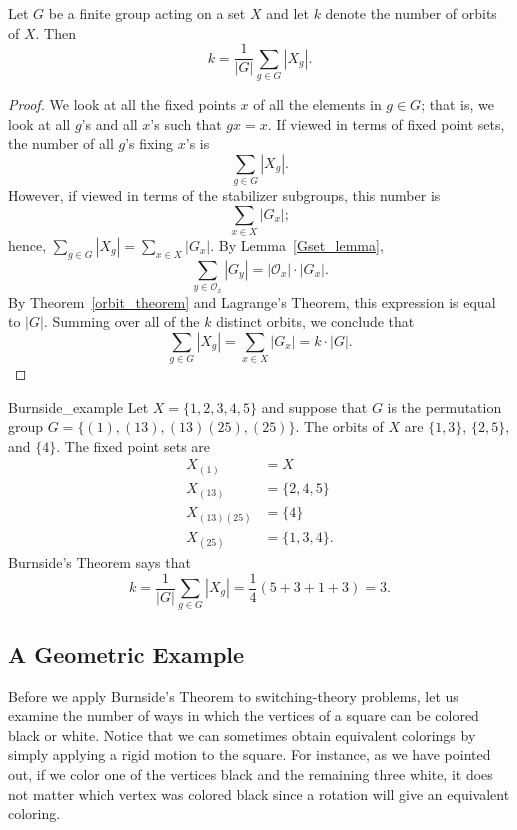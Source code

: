 
\begin{theorem}[Burnside]
Let $G$ be a  finite group acting on a set $X$ and let $k$ denote the
number of orbits of $X$. Then
\[
k = \frac{1}{|G|} \sum_{g \in G} |X_g|.
\]
\end{theorem}
 
 
\begin{proof}
We look at all the fixed points $x$ of all the elements in $g \in G$;
that is, we look at all $g$'s and all $x$'s such that $gx =x$.
If viewed in terms of fixed point sets, the number of all $g$'s fixing
$x$'s is 
\[
\sum_{g \in G} |X_g|.
\]
However, if viewed in terms of the stabilizer subgroups, this number
is 
\[
\sum_{x \in X} |G_x|;
\]
hence, $\sum_{g \in G} |X_g| = \sum_{x \in X} |G_x|$. By Lemma~\ref{Gset_lemma}, 
\[
\sum_{y \in {\mathcal O}_x} |G_y|  =  | {\mathcal O}_x| \cdot |G_x|.
\]
By Theorem~\ref{orbit_theorem} and Lagrange's Theorem, this expression is equal 
to $|G|$. Summing over all of the $k$ distinct orbits, we conclude that
\[
\sum_{g \in G} |X_g| = \sum_{x \in X} |G_x| = k \cdot |G|.
\]
\end{proof}
 
 
\begin{example}{Burnside_example}
Let $X = \{1, 2, 3, 4, 5 \}$ and suppose that $G$ is the permutation
group $G= \{(1), (1 3), (1 3)(2 5), (2 5) \}$. The orbits of $X$ are
$\{1, 3\}$, $\{2, 5\}$, and $\{4\}$. The fixed point sets are 
\begin{align*}
X_{(1)} & =  X \\
X_{(1 3)} & =  \{2, 4, 5 \} \\
X_{(1 3)(2 5)} & =  \{4\} \\
X_{(2 5)} & =  \{1, 3, 4 \} .
\end{align*}
Burnside's Theorem says that
\[
k = \frac{1}{|G|} \sum_{g \in G} |X_g| = \frac{1}{4}(5+
3+1+3) = 3.
\]
\end{example}
 
 
 
\subsection*{A Geometric Example}
 
 
 
Before we apply Burnside's Theorem to switching-theory problems, let
us examine the number of ways in which the vertices of a square can be
colored black or white. Notice that we can sometimes obtain equivalent
colorings by simply applying a rigid motion to the square. For
instance, as we have pointed out, if we color one of the vertices
black and the remaining three white, it does not matter which vertex
was colored black since a rotation will give an equivalent coloring.  
 
